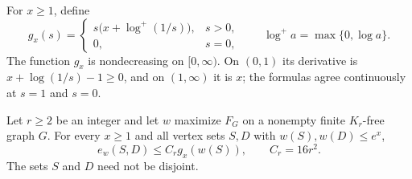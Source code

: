 For $x\ge1$, define
\[
 g_x(s)=
 \begin{cases}
 s\bigl(x+\log^+(1/s)\bigr),&s>0,\\
 0,&s=0,
 \end{cases}
 \qquad \log^+ a=\max\{0,\log a\}.
\]
The function $g_x$ is nondecreasing on $[0,\infty)$.  On $(0,1)$ its
derivative is $x+\log(1/s)-1\ge0$, and on $(1,\infty)$ it is $x$;
the formulas agree continuously at $s=1$ and $s=0$.

\begin{lemma}\label{lem:cross-mass}
Let $r\ge2$ be an integer and let $w$ maximize $F_G$ on a nonempty finite $K_r$-free
graph $G$.  For every $x\ge1$ and all vertex sets $S,D$ with
$w(S),w(D)\le e^x$,
\begin{equation}\label{eq:optimizer-cross-mass}
 e_w(S,D)\le C_r g_x(w(S)),
 \qquad C_r=16r^2.
\end{equation}
The sets $S$ and $D$ need not be disjoint.
\end{lemma}

